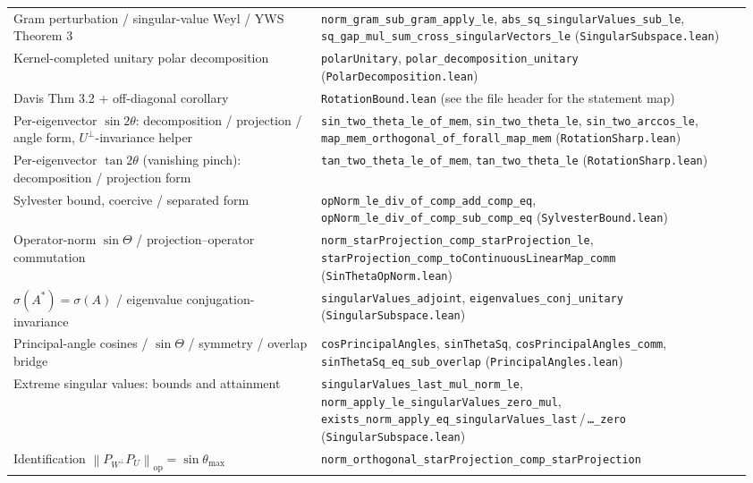 \documentclass[11pt]{article}
\newcommand{\norm}[1]{\left\lVert #1\right\rVert}
\newcommand{\op}{\mathrm{op}}
\theoremstyle{remark}
\begin{document}
\begin{center}
\begin{tabular}{@{}p{0.40\linewidth}p{0.56\linewidth}@{}}
Gram perturbation / singular-value Weyl / YWS Theorem 3
  & \texttt{norm\_gram\_sub\_gram\_apply\_le},
    \texttt{abs\_sq\_singularValues\_sub\_le},
    \texttt{sq\_gap\_mul\_sum\_cross\_singularVectors\_le} (\texttt{SingularSubspace.lean}) \\
Kernel-completed unitary polar decomposition
  & \texttt{polarUnitary}, \texttt{polar\_decomposition\_unitary} (\texttt{PolarDecomposition.lean}) \\
Davis Thm 3.2 + off-diagonal corollary
  & \texttt{RotationBound.lean} (see the file header for the statement map) \\
Per-eigenvector $\sin2\theta$: decomposition / projection / angle form,
$U^{\perp}$-invariance helper
  & \texttt{sin\_two\_theta\_le\_of\_mem}, \texttt{sin\_two\_theta\_le},
    \texttt{sin\_two\_arccos\_le},
    \texttt{map\_mem\_orthogonal\_of\_forall\_map\_mem} (\texttt{RotationSharp.lean}) \\
Per-eigenvector $\tan2\theta$ (vanishing pinch): decomposition / projection form
  & \texttt{tan\_two\_theta\_le\_of\_mem}, \texttt{tan\_two\_theta\_le}
    (\texttt{RotationSharp.lean}) \\
Sylvester bound, coercive / separated form
  & \texttt{opNorm\_le\_div\_of\_comp\_add\_comp\_eq},
    \texttt{opNorm\_le\_div\_of\_comp\_sub\_comp\_eq} (\texttt{SylvesterBound.lean}) \\
Operator-norm $\sin\Theta$ / projection--operator commutation
  & \texttt{norm\_starProjection\_comp\_starProjection\_le},
    \texttt{starProjection\_comp\_toContinuousLinearMap\_comm}
    (\texttt{SinThetaOpNorm.lean}) \\
$\sigma(A^{*})=\sigma(A)$ / eigenvalue conjugation-invariance
  & \texttt{singularValues\_adjoint}, \texttt{eigenvalues\_conj\_unitary}
    (\texttt{SingularSubspace.lean}) \\
Principal-angle cosines / $\sin\Theta$ / symmetry / overlap bridge
  & \texttt{cosPrincipalAngles}, \texttt{sinThetaSq},
    \texttt{cosPrincipalAngles\_comm}, \texttt{sinThetaSq\_eq\_sub\_overlap}
    (\texttt{PrincipalAngles.lean}) \\
Extreme singular values: bounds and attainment
  & \texttt{singularValues\_last\_mul\_norm\_le},
    \texttt{norm\_apply\_le\_singularValues\_zero\_mul},
    \texttt{exists\_norm\_apply\_eq\_singularValues\_last}\,/\,\texttt{\dots\_zero}
    (\texttt{SingularSubspace.lean}) \\
Identification $\norm{P_{W^{\perp}}P_U}_{\op}=\sin\theta_{\max}$
  & \texttt{norm\_orthogonal\_starProjection\_comp\_starProjection}

\end{tabular}
\end{center}
\end{document}
